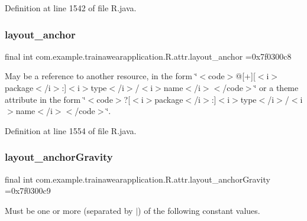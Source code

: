 Definition at line 1542 of file R.\+java.

\mbox{\label{classcom_1_1example_1_1trainawearapplication_1_1_r_1_1attr_a52aba3a039091c72373d231f514108e2}} 
\subsubsection{\texorpdfstring{layout\_anchor}{layout\_anchor}}
{\footnotesize\ttfamily final int com.\+example.\+trainawearapplication.\+R.\+attr.\+layout\+\_\+anchor =0x7f0300c8\hspace{0.3cm}{\ttfamily [static]}}

May be a reference to another resource, in the form \char`\"{}$<$code$>$@\mbox{[}+\mbox{]}\mbox{[}$<$i$>$package$<$/i$>$\+:\mbox{]}$<$i$>$type$<$/i$>$/$<$i$>$name$<$/i$>$$<$/code$>$\char`\"{} or a theme attribute in the form \char`\"{}$<$code$>$?\mbox{[}$<$i$>$package$<$/i$>$\+:\mbox{]}$<$i$>$type$<$/i$>$/$<$i$>$name$<$/i$>$$<$/code$>$\char`\"{}. 

Definition at line 1554 of file R.\+java.

\mbox{\label{classcom_1_1example_1_1trainawearapplication_1_1_r_1_1attr_aff49a8f88c1b16bf8a08952306119171}} 
\subsubsection{\texorpdfstring{layout\_anchorGravity}{layout\_anchorGravity}}
{\footnotesize\ttfamily final int com.\+example.\+trainawearapplication.\+R.\+attr.\+layout\+\_\+anchor\+Gravity =0x7f0300c9\hspace{0.3cm}{\ttfamily [static]}}

Must be one or more (separated by \textquotesingle{}$\vert$\textquotesingle{}) of the following constant values.

